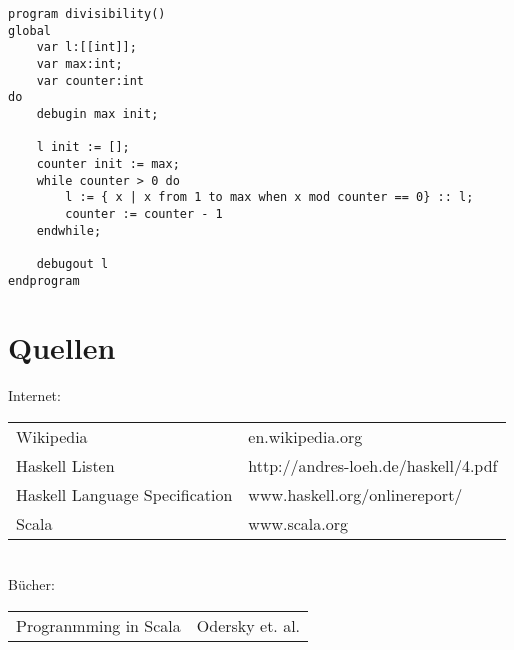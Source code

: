 \documentclass[a4paper,notitlepage,oneside]{article}
\begin{document}
\begin{lstlisting}[language=iml, caption=Teilbarkeit]
program divisibility() 
global 
	var l:[[int]];
	var max:int;
	var counter:int
do 
	debugin max init;
	
	l init := [];
	counter init := max;
	while counter > 0 do
		l := { x | x from 1 to max when x mod counter == 0} :: l;
		counter := counter - 1
	endwhile;
	
	debugout l
endprogram
\end{lstlisting}

\section{Quellen}
Internet:\\
\begin{tabular}{l l}
Wikipedia & en.wikipedia.org \\
Haskell Listen  & http://andres-loeh.de/haskell/4.pdf \\
Haskell Language Specification & www.haskell.org/onlinereport/ \\
Scala & www.scala.org
\end{tabular} \\
Bücher: \\
\begin{tabular}{l l}
Progranmming in Scala & Odersky et. al. \\
\end{tabular}
\end{document}
